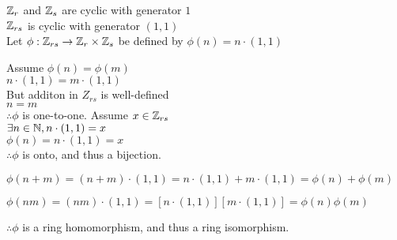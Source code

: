 \documentclass[letterpaper,12pt,fleqn]{article}
\begin{document}
\begin{theproof}
  $\mathbb{Z}_r$ and $\mathbb{Z}_s$ are cyclic with generator $1$ \\
  $\mathbb{Z}_{rs}$ is cyclic with generator $(1,1)$ \\
  Let $\phi:\mathbb{Z}_{rs}\to\mathbb{Z}_r\times\mathbb{Z}_s$ be defined by $\phi(n)=n\cdot(1,1)$

  Assume $\phi(n)=\phi(m)$ \\
  $n\cdot(1,1)=m\cdot(1,1)$ \\
  But additon in $Z_{rs}$ is well-defined \\
  $n=m$ \\
  $\therefore\phi$ is one-to-one.
\newpage
  Assume $x\in\mathbb{Z}_{rs}$ \\
  $\exists n\in\mathbb{N},n\cdot(1,1)=x$ \\
  $\phi(n)=n\cdot(1,1)=x$ \\
  $\therefore\phi$ is onto, and thus a bijection.

  $\phi(n+m)=(n+m)\cdot(1,1)=n\cdot(1,1)+m\cdot(1,1)=\phi(n)+\phi(m)$

  $\phi(nm)=(nm)\cdot(1,1)=[n\cdot(1,1)][m\cdot(1,1)]=\phi(n)\phi(m)$

  $\therefore\phi$ is a ring homomorphism, and thus a ring isomorphism.
\end{theproof}
\end{document}
